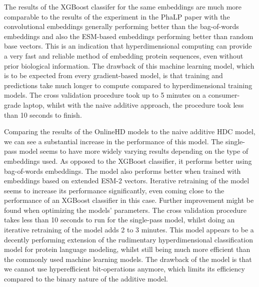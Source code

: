 The results of the XGBoost classifer for the same embeddings are much more comparable to the results of the experiment in the PhaLP paper with the convolutional embeddings generally performing better than the bag-of-words embeddings and also the ESM-based embeddings performing better than random base vectors. This is an indication that hyperdimensional computing can provide a very fast and reliable method of embedding protein sequences, even without prior biological information. The drawback of this machine learning model, which is to be expected from every gradient-based model, is that training and predictions take much longer to compute compared to hyperdimensional training models. The cross validation procedure took up to 5 minutes on a consumer-grade laptop, whilst with the naive additive approach, the procedure took less than 10 seconds to finish.

Comparing the results of the OnlineHD models to the naive additive HDC model, we can see a substantial increase in the performance of this model. The single-pass model seems to have more widely varying results depending on the type of embeddings used. As opposed to the XGBoost classifier, it performs better using bag-of-words embeddings. The model also performs better when trained with embeddings based on extended ESM-2 vectors. Iterative retraining of the model seems to increase its performance significantly, even coming close to the performance of an XGBoost classifier in this case. Further improvement might be found when optimizing the models' parameters. The cross validation procedure takes less than 10 seconds to run for the single-pass model, whilst doing an iterative retraining of the model adds 2 to 3 minutes. This model appears to be a decently performing extension of the rudimentary hyperdimensional classification model for protein language modeling, whilst still being much more efficient than the commonly used machine learning models. The drawback of the model is that we cannot use hyperefficient bit-operations anymore, which limits its efficiency compared to the binary nature of the additive model.

